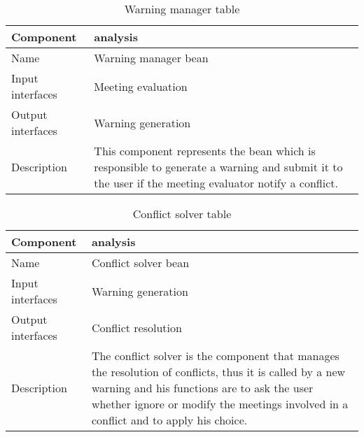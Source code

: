 \begin{flushleft}
	
	\begin{table}[htp]
		
		\begin{tabular}{l|l}
			Component&analysis\\
			\hline
			\hline
			Name&Warning manager bean\\
			\hline
			Input interfaces& Meeting evaluation\\
			\hline
			Output interfaces& Warning generation\\
			\hline
			Description&This component represents the bean which is responsible to generate a warning and submit it to the user if the meeting evaluator notify a conflict. \\
			\hline
				
		\end{tabular}
		
		\caption{Warning manager table } 
		\label{tab:warningmanagertable}
		
	\end{table}
	
\end{flushleft}

\begin{flushleft}
	
	\begin{table}[htp]
		
		\begin{tabular}{l|l}
			Component&analysis\\
			\hline
			\hline
			Name&Conflict solver bean\\
			\hline
			Input interfaces& Warning generation\\
			\hline
			Output interfaces& Conflict resolution\\
			\hline
			Description&The conflict solver is the component that manages the resolution of conflicts, thus it is called by a new warning and his functions are to ask the user whether ignore or modify the meetings involved in a conflict and to apply his choice. \\
			\hline
			
		\end{tabular}
		
		\caption{Conflict solver table } 
		\label{tab:conflictsolvertable}
		
	\end{table}
	
\end{flushleft}

